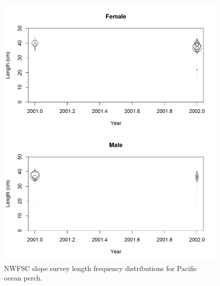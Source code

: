 \documentclass[12pt,]{article}
\begin{document}
\begin{figure}
\centering
\includegraphics{Figures/NWslope_Lengths.png}
\caption{NWFSC slope survey length frequency distributions for Pacific
ocean perch. \label{fig:nw_slope_Length}}
\end{figure}

\FloatBarrier
\end{document}
